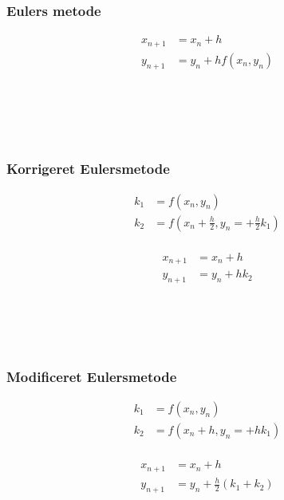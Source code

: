 
\begin{frame}
\frametitle{Eulers metode } 
\begin{minipage}[b]{0.31\textwidth}
\begin{align*}
x_{n+1} & = x_n+h \\
y_{n+1} & = y_n + h f(x_n,y_n) \\
\phantom{x_1}\\
\\
\\
\end{align*}
\end{minipage}
\phantom{hejmeddig}
%

\\
\phantom{H}
\\
%
\end{frame}
%
%
%
%
\begin{frame}
\frametitle{Korrigeret Eulersmetode } 
\begin{minipage}[b]{0.31\textwidth}
\begin{align*}
k_1 & = f(x_n , y_n) \\
k_2 & = f \left( x_n + \frac{h}{2} , y_n = + \frac{h}{2} k_1 \right)  \\
\end{align*}
\end{minipage} 
\phantom{Hej}
\begin{minipage}[b]{0.31\textwidth}
\begin{align*}
x_{n+1} & = x_n+h \\
y_{n+1} & = y_n + h k_2 \\
\end{align*}
\end{minipage} 
\\
%

\\
\phantom{H}
\\
%
\end{frame}
%
%
%
\begin{frame}
\frametitle{Modificeret Eulersmetode}  
\begin{minipage}[b]{0.31\textwidth}
\begin{align*}
k_1 & = f(x_n , y_n) \\
k_2 & = f( x_n + h , y_n = + h k_1 ) \\
\end{align*}
%
\end{minipage} 
\phantom{Hej}
\begin{minipage}[b]{0.31\textwidth}
\begin{align*}
x_{n+1} & = x_n+h \\
y_{n+1} & = y_n + \frac{h}{2} (k_1 + k_2 ) \\
\end{align*}
%
\end{minipage} 
\\

\\
\phantom{H}
\\
%
\end{frame}
